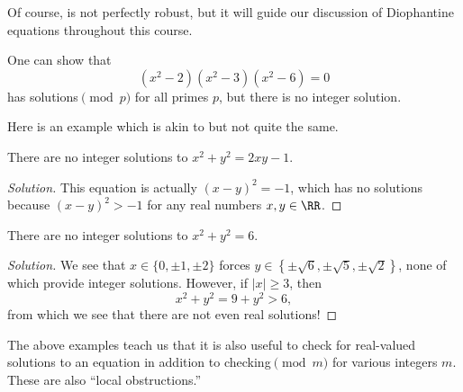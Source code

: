 \documentclass[../notes.tex]{subfiles}
\begin{document}
Of course,  is not perfectly robust, but it will guide our discussion of Diophantine equations throughout this course.
\begin{nex}
	One can show that
	\[\left(x^2-2\right)\left(x^2-3\right)\left(x^2-6\right)=0\]
	has solutions$\pmod p$ for all primes $p$, but there is no integer solution.
\end{nex}
Here is an example which is akin to  but not quite the same.
\begin{example}
	There are no integer solutions to $x^2+y^2=2xy-1$.
\end{example}
\begin{proof}[Solution]
	This equation is actually $(x-y)^2=-1$, which has no solutions because $(x-y)^2>-1$ for any real numbers $x,y\in\RR$.
\end{proof}
\begin{example}
	There are no integer solutions to $x^2+y^2=6$.
\end{example}
\begin{proof}[Solution]
	We see that $x\in\{0,\pm1,\pm2\}$ forces $y\in\left\{\pm\sqrt6,\pm\sqrt5,\pm\sqrt2\right\}$, none of which provide integer solutions. However, if $\left|x\right|\ge3$, then
	\[x^2+y^2=9+y^2>6,\]
	from which we see that there are not even real solutions!
\end{proof}
The above examples teach us that it is also useful to check for real-valued solutions to an equation in addition to checking$\pmod m$ for various integers $m$. These are also ``local obstructions.''
\end{document}
